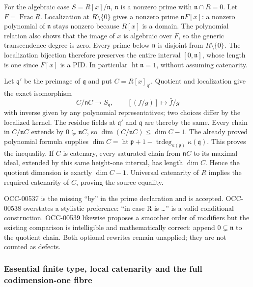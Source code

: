 For the algebraic case \(S=R[x]/\mathfrak n\), \(\mathfrak n\) is a nonzero prime with \(\mathfrak n\cap R=0\). Let \(F=\operatorname{Frac}R\). Localization at \(R\setminus\{0\}\) gives a nonzero prime \(\mathfrak nF[x]\): a nonzero polynomial of \(\mathfrak n\) stays nonzero because \(R[x]\) is a domain. The polynomial relation also shows that the image of \(x\) is algebraic over \(F\), so the generic transcendence degree is zero. Every prime below \(\mathfrak n\) is disjoint from \(R\setminus\{0\}\). The localization bijection therefore preserves the entire interval \([0,\mathfrak n]\), whose length is one since \(F[x]\) is a PID. In particular \(\operatorname{ht}\mathfrak n=1\), without assuming catenarity.

Let \(\mathfrak q'\) be the preimage of \(\mathfrak q\) and put \(C=R[x]_{\mathfrak q'}\). Quotient and localization give the exact isomorphism \[
 C/\mathfrak nC\longrightarrow S_{\mathfrak q},\qquad
 [(f/g)]\longmapsto \bar f/\bar g
\] with inverse given by any polynomial representatives; two choices differ by the localized kernel. The residue fields at \(\mathfrak q'\) and \(\mathfrak q\) are thereby the same. Every chain in \(C/\mathfrak nC\) extends by \(0\subsetneq\mathfrak nC\), so \(\dim(C/\mathfrak nC)\leq\dim C-1\). The already proved polynomial formula supplies \(\dim C=\operatorname{ht}\mathfrak p+1-
\operatorname{trdeg}_{\kappa(\mathfrak p)}\kappa(\mathfrak q)\). This proves the inequality. If \(C\) is catenary, every saturated chain from \(\mathfrak nC\) to its maximal ideal, extended by this same height-one interval, has length \(\dim C\). Hence the quotient dimension is exactly \(\dim C-1\). Universal catenarity of \(R\) implies the required catenarity of \(C\), proving the source equality.

OCC-00537 is the missing ``by'' in the prime declaration and is accepted. OCC-00538 overstates a stylistic preference: ``in case R is \ldots{}'' is a valid conditional construction. OCC-00539 likewise proposes a smoother order of modifiers but the existing comparison is intelligible and mathematically correct: append \(0\subsetneq\mathfrak n\) to the quotient chain. Both optional rewrites remain unapplied; they are not counted as defects.

\subsubsection{Essential finite type, local catenarity and the full codimension-one fibre}\label{algebra-proof-024-essential-finite-type-local-catenarity-and-the-full-codimension-one-fibre}

